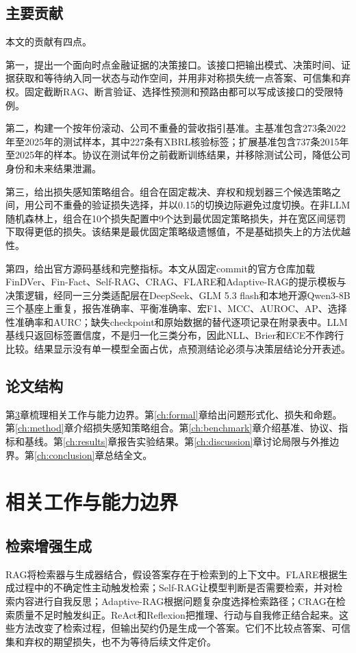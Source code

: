\documentclass[12pt,openany]{ctexbook}
\begin{document}
\section{主要贡献}
本文的贡献有四点。\par
第一，提出一个面向时点金融证据的决策接口。该接口把输出模式、决策时间、证据获取和等待纳入同一状态与动作空间，并用非对称损失统一点答案、可信集和弃权。固定截断RAG、断言验证、选择性预测和预路由都可以写成该接口的受限特例。\par
第二，构建一个按年份滚动、公司不重叠的营收指引基准。主基准包含273条2022年至2025年的测试样本，其中227条有XBRL核验标签；扩展基准包含737条2015年至2025年的样本。协议在测试年份之前截断训练结果，并移除测试公司，降低公司身份和未来结果泄漏。\par
第三，给出损失感知策略组合。组合在固定裁决、弃权和规划器三个候选策略之间，用公司不重叠的验证损失选择，并以0.15的切换边际避免过度切换。在非LLM随机森林上，组合在10个损失配置中9个达到最优固定策略损失，并在宽区间惩罚下取得更低的损失。该结果是最优固定策略级遗憾值，不是基础损失上的方法优越性。\par
第四，给出官方源码基线和完整指标。本文从固定commit的官方仓库加载FinDVer、Fin-Fact、Self-RAG、CRAG、FLARE和Adaptive-RAG的提示模板与决策逻辑，经同一三分类适配层在DeepSeek、GLM 5.3 flash和本地开源Qwen3-8B三个基座上重复，报告准确率、平衡准确率、宏F1、MCC、AUROC、AP、选择性准确率和AURC；缺失checkpoint和原始数据的替代逐项记录在附录表中。LLM基线只返回标签置信度，不是归一化三类分布，因此NLL、Brier和ECE不作跨行比较。结果显示没有单一模型全面占优，点预测结论必须与决策层结论分开表述。\par

\section{论文结构}
第\ref{ch:related}章梳理相关工作与能力边界。第\ref{ch:formal}章给出问题形式化、损失和命题。第\ref{ch:method}章介绍损失感知策略组合。第\ref{ch:benchmark}章介绍基准、协议、指标和基线。第\ref{ch:results}章报告实验结果。第\ref{ch:discussion}章讨论局限与外推边界。第\ref{ch:conclusion}章总结全文。\par

\chapter{相关工作与能力边界}
\label{ch:related}

\section{检索增强生成}
RAG将检索器与生成器结合，假设答案存在于检索到的上下文中\cite{lewis2020rag}。FLARE根据生成过程中的不确定性主动触发检索\cite{jiang2023flare}；Self-RAG让模型判断是否需要检索，并对检索内容进行自我反思\cite{asai2024selfrag}；Adaptive-RAG根据问题复杂度选择检索路径\cite{jeong2024adaptiverag}；CRAG在检索质量不足时触发纠正\cite{yan2024crag}。ReAct和Reflexion把推理、行动与自我修正结合起来\cite{yao2023react,shinn2023reflexion}。这些方法改变了检索过程，但输出契约仍是生成一个答案。它们不比较点答案、可信集和弃权的期望损失，也不为等待后续文件定价。\par
\end{document}
